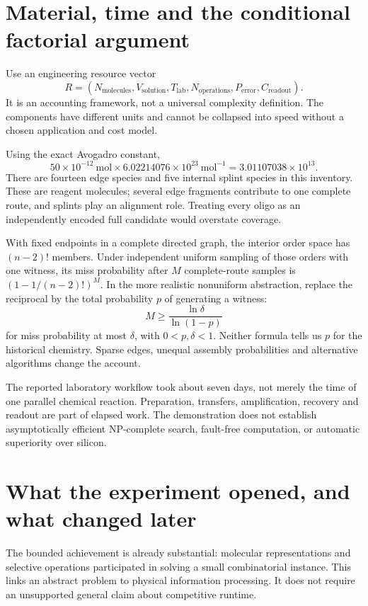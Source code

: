 \section{Material, time and the conditional factorial argument}
Use an engineering resource vector
\[
R=(N_{\mathrm{molecules}},V_{\mathrm{solution}},T_{\mathrm{lab}},
N_{\mathrm{operations}},P_{\mathrm{error}},C_{\mathrm{readout}}).
\]
It is an accounting framework, not a universal complexity definition. The components have different units and cannot be collapsed into speed without a chosen application and cost model.


Using the exact Avogadro constant,\cite{BIPMmole}
\[
50\times10^{-12}\ \mathrm{mol}\times
6.02214076\times10^{23}\ \mathrm{mol}^{-1}
=3.01107038\times10^{13}.
\]
There are fourteen edge species and five internal splint species in this inventory. These are reagent molecules; several edge fragments contribute to one complete route, and splints play an alignment role. Treating every oligo as an independently encoded full candidate would overstate coverage.

With fixed endpoints in a complete directed graph, the interior order space has $(n-2)!$ members. Under independent uniform sampling of those orders with one witness, its miss probability after $M$ complete-route samples is $(1-1/(n-2)!)^M$. In the more realistic nonuniform abstraction, replace the reciprocal by the total probability $p$ of generating a witness:
\[
M\ge\frac{\ln\delta}{\ln(1-p)}
\]
for miss probability at most $\delta$, with $0<p,\delta<1$. Neither formula tells us $p$ for the historical chemistry. Sparse edges, unequal assembly probabilities and alternative algorithms change the account.

The reported laboratory workflow took about seven days, not merely the time of one parallel chemical reaction.\cite{Adleman1994} Preparation, transfers, amplification, recovery and readout are part of elapsed work. The demonstration does not establish asymptotically efficient NP-complete search, fault-free computation, or automatic superiority over silicon.

\section{What the experiment opened, and what changed later}
The bounded achievement is already substantial: molecular representations and selective operations participated in solving a small combinatorial instance. This links an abstract problem to physical information processing. It does not require an unsupported general claim about competitive runtime.

